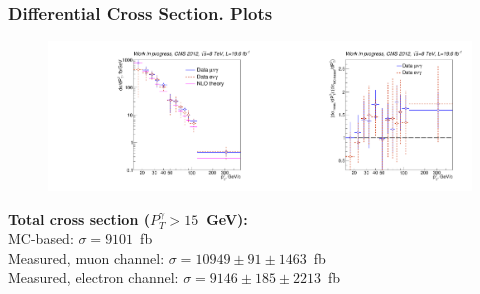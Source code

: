 \begin{frame}\frametitle{Differential Cross Section. Plots}
\begin{figure}[htb]
  \begin{center}
   \includegraphics[width=0.5\textwidth]{../figs/figs_v11/ChannelsMERGED_WGamma/CrossSection/compareCSWGamma.pdf}\includegraphics[width=0.5\textwidth]{../figs/figs_v11/ChannelsMERGED_WGamma/CrossSection/compareCSratioTheoryWGamma.pdf}\\
  \end{center}
\end{figure}
\scriptsize
{\bfseries{Total cross section ($P_T^{\gamma}>15$~GeV):}}\\
MC-based: $\sigma=9101$~fb\\
Measured, muon channel:   $\sigma = 10949 \pm 91 \pm 1463$~fb\\
Measured, electron channel:   $\sigma = 9146 \pm 185 \pm 2213$~fb\\
\end{frame}%

